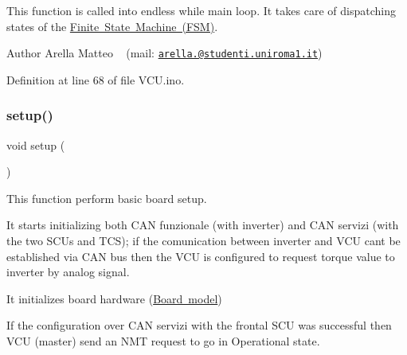 This function is called into endless while main loop. It takes care of dispatching states of the \mbox{\hyperlink{_f_s_m_page}{Finite State Machine (F\+SM)}}. 

\begin{DoxyAuthor}{Author}
Arella Matteo ~\newline
 (mail\+: \href{mailto:arella.1646983@studenti.uniroma1.it}{\tt arella.@studenti.\+uniroma1.\+it}) 
\end{DoxyAuthor}


Definition at line 68 of file V\+C\+U.\+ino.

\mbox{\label{group___main__group__module_ga4fc01d736fe50cf5b977f755b675f11d}} 
\subsubsection{\texorpdfstring{setup()}{setup()}}
{\footnotesize\ttfamily void setup (\begin{DoxyParamCaption}{ }\end{DoxyParamCaption})}



This function perform basic board setup. 


\begin{DoxyItemize}
\item It starts initializing both C\+AN funzionale (with inverter) and C\+AN servizi (with the two S\+C\+Us and T\+CS); if the comunication between inverter and V\+CU can\textquotesingle{}t be established via C\+AN bus then the V\+CU is configured to request torque value to inverter by analog signal.
\item It initializes board hardware (\mbox{\hyperlink{group___board__model__group}{Board model}})
\item If the configuration over C\+AN servizi with the frontal S\+CU was successful then V\+CU (master) send an N\+MT request to go in \textquotesingle{}Operational\textquotesingle{} state.
\end{DoxyItemize}

